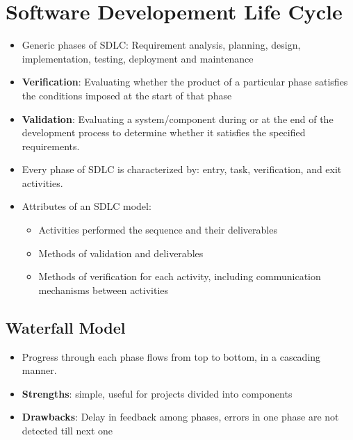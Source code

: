 \documentclass{article}
\begin{document}
\section{Software Developement Life Cycle}
\begin{itemize}
    \item Generic phases of SDLC: Requirement analysis, planning, design, implementation, testing, deployment and maintenance
    
    \item \textbf{Verification}: Evaluating whether the product of a particular phase satisfies the conditions imposed at the start of that phase
    
    \item \textbf{Validation}: Evaluating a system/component during or at the end of the development process to determine whether it satisfies the specified requirements.
    
    \item Every phase of SDLC is characterized by: entry, task, verification, and exit activities.
    
    \item Attributes of an SDLC model:
    \begin{itemize}
        \item Activities performed the sequence and their deliverables
        
        \item Methods of validation and deliverables
        
        \item Methods of verification for each activity, including communication mechanisms between activities
    \end{itemize}
\end{itemize}

\subsection{Waterfall Model}
\begin{itemize}
    \item Progress through each phase flows from top to bottom, in a cascading manner.
    
    \item \textbf{Strengths}: simple, useful for projects divided into components
    
    \item \textbf{Drawbacks}: Delay in feedback among phases, errors in one phase are not detected till next one
\end{itemize}
\end{document}
